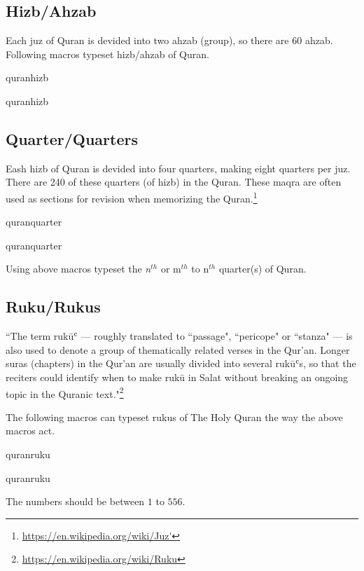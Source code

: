 \documentclass{ltxdoc}
\begin{document}
\subsection{Hizb/Ahzab}
Each juz of Quran is devided into two ahzab (group),  so there are 60 ahzab.
Following macros typeset hizb/ahzab of Quran. 

\begin{declcs}{quranhizb}
\end{declcs}
\begin{declcs}{quranhizb}
\end{declcs}

\subsection{Quarter/Quarters}
Eash hizb of Quran is devided into four quarters, making eight quarters per juz. 
There are 240 of these quarters (of hizb) in the Quran. These maqra are often used as sections for revision when memorizing the Quran.\footnote{\url{https://en.wikipedia.org/wiki/Juz'}}
\begin{declcs}{quranquarter}
\end{declcs}
\begin{declcs}{quranquarter}
\end{declcs}

Using above macros typeset the \textit{n}$^{th}$ or m$^{th}$ to n$^{th}$ quarter(s) of Quran.   

\subsection{Ruku/Rukus}
``The term ruk\= uʿ --- roughly translated to ``passage", ``pericope" or ``stanza" --- is also used to denote a group of thematically related verses in the Qur'an. Longer suras (chapters) in the Qur'an are usually divided into several rukūʿs, so that the reciters could identify when to make ruk\= u in Salat without breaking an ongoing topic in the Quranic text."\footnote{\url{https://en.wikipedia.org/wiki/Ruku}}

The following macros can typeset rukus of The Holy Quran the way the above macros act. 

\begin{declcs}{quranruku}
\end{declcs}
\begin{declcs}{quranruku}
\end{declcs}
The numbers should be between $1$ to $556$.
\end{document}
